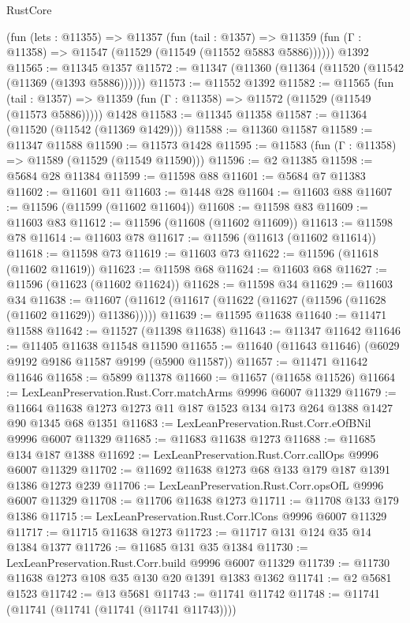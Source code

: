 \begin{lexlean}{RustCore}
\begin{coremodule}
    (fun (lets : @11355) =>
    @11357
      (fun (tail : @1357) =>
      @11359 (fun (Γ : @11358) => @11547 (@11529 (@11549 (@11552 @5883 @5886))))))
    @1392
@11565 := @11345 @1357
@11572 := @11347 (@11360 (@11364 (@11520 (@11542 (@11369 (@1393 @5886))))))
@11573 := @11552 @1392
@11582 := @11565
    (fun (tail : @1357) => @11359 (fun (Γ : @11358) => @11572 (@11529 (@11549 (@11573 @5886)))))
    @1428
@11583 := @11345 @11358
@11587 := @11364 (@11520 (@11542 (@11369 @1429)))
@11588 := @11360 @11587
@11589 := @11347 @11588
@11590 := @11573 @1428
@11595 := @11583 (fun (Γ : @11358) => @11589 (@11529 (@11549 @11590)))
@11596 := @2 @11385
@11598 := @5684 @28 @11384
@11599 := @11598 @88
@11601 := @5684 @7 @11383
@11602 := @11601 @11
@11603 := @1448 @28
@11604 := @11603 @88
@11607 := @11596 (@11599 (@11602 @11604))
@11608 := @11598 @83
@11609 := @11603 @83
@11612 := @11596 (@11608 (@11602 @11609))
@11613 := @11598 @78
@11614 := @11603 @78
@11617 := @11596 (@11613 (@11602 @11614))
@11618 := @11598 @73
@11619 := @11603 @73
@11622 := @11596 (@11618 (@11602 @11619))
@11623 := @11598 @68
@11624 := @11603 @68
@11627 := @11596 (@11623 (@11602 @11624))
@11628 := @11598 @34
@11629 := @11603 @34
@11638 := @11607 (@11612 (@11617 (@11622 (@11627 (@11596 (@11628 (@11602 @11629)) @11386)))))
@11639 := @11595 @11638
@11640 := @11471 @11588
@11642 := @11527 (@11398 @11638)
@11643 := @11347 @11642
@11646 := @11405 @11638 @11548 @11590
@11655 := @11640 (@11643 @11646) (@6029 @9192 @9186 @11587 @9199 (@5900 @11587))
@11657 := @11471 @11642 @11646
@11658 := @5899 @11378
@11660 := @11657 (@11658 @11526)
@11664 := LexLeanPreservation.Rust.Corr.matchArms @9996 @6007 @11329
@11679 := @11664 @11638 @1273 @1273 @11 @187 @1523 @134 @173 @264 @1388 @1427 @90 @1345 @68 @1351
@11683 := LexLeanPreservation.Rust.Corr.eOfBNil @9996 @6007 @11329
@11685 := @11683 @11638 @1273
@11688 := @11685 @134 @187 @1388
@11692 := LexLeanPreservation.Rust.Corr.callOps @9996 @6007 @11329
@11702 := @11692 @11638 @1273 @68 @133 @179 @187 @1391 @1386 @1273 @239
@11706 := LexLeanPreservation.Rust.Corr.opsOfL @9996 @6007 @11329
@11708 := @11706 @11638 @1273
@11711 := @11708 @133 @179 @1386
@11715 := LexLeanPreservation.Rust.Corr.lCons @9996 @6007 @11329
@11717 := @11715 @11638 @1273
@11723 := @11717 @131 @124 @35 @14 @1384 @1377
@11726 := @11685 @131 @35 @1384
@11730 := LexLeanPreservation.Rust.Corr.build @9996 @6007 @11329
@11739 := @11730 @11638 @1273 @108 @35 @130 @20 @1391 @1383 @1362
@11741 := @2 @5681 @1523
@11742 := @13 @5681
@11743 := @11741 @11742
@11748 := @11741 (@11741 (@11741 (@11741 (@11741 @11743))))

\end{coremodule}
\end{lexlean}
